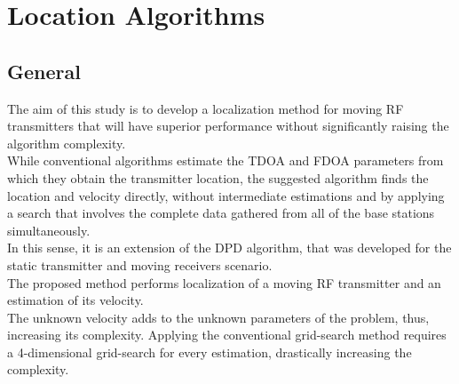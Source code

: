 
\chapter{Location Algorithms} %
\label{Chapter4}
\section{General}
The aim of this study is to develop a localization method for moving RF transmitters that
will have superior performance without significantly raising the algorithm complexity.\\
While conventional algorithms estimate the TDOA and FDOA parameters from which they obtain the transmitter
location, the suggested algorithm finds the location and velocity directly, without intermediate estimations
and by applying a search that involves the complete data gathered from all of the base stations simultaneously. \\
In this sense, it is an extension of the DPD algorithm, that was developed for the static transmitter and moving receivers scenario.\\
 The proposed method performs localization of a moving RF transmitter and an estimation
of its velocity.\\
The unknown velocity adds to the unknown parameters of the problem, thus, increasing its
complexity. Applying the conventional grid-search method requires a 4-dimensional grid-search for every
estimation, drastically increasing the complexity.\\

